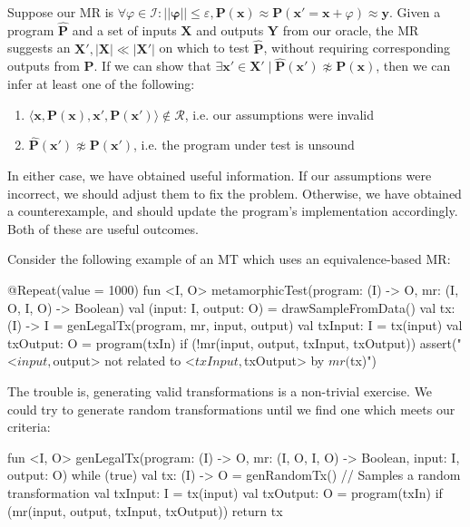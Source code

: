 \documentclass[12pt,initial,twoside,maitrise]{dms}
\numberwithin{equation}{section}
\numberwithin{table}{chapter}
\numberwithin{figure}{chapter}
\begin{document}
Suppose our MR is $\forall \varphi \in \mathcal I: ||\mathbf\varphi|| \leq \varepsilon, \mathbf P(\mathbf x) \approx \mathbf P(\mathbf x' = \mathbf x + \varphi) \approx \mathbf y$. Given a program $\mathbf{\hat P}$ and a set of inputs $\mathbf X$ and outputs $\mathbf Y$ from our oracle, the MR suggests an $\mathbf X', |\mathbf X| \ll |\mathbf X'|$ on which to test $\mathbf{\hat P}$, without requiring corresponding outputs from $\mathbf P$. If we can show that $\exists \mathbf x' \in \mathbf X' \mid \mathbf{\hat P}(\mathbf x') \not\approx \mathbf P(\mathbf x)$, then we can infer at least one of the following:

\begin{enumerate}
\item $\langle \mathbf x, \mathbf P(\mathbf x), \mathbf x', \mathbf P(\mathbf x')\rangle \notin \mathcal R$, i.e. our assumptions were invalid
\item $\mathbf{\hat P}(\mathbf x') \not\approx \mathbf{P}(\mathbf x')$, i.e. the program under test is unsound
\end{enumerate}
%
In either case, we have obtained useful information. If our assumptions were incorrect, we should adjust them to fix the problem. Otherwise, we have obtained a counterexample, and should update the program's implementation accordingly. Both of these are useful outcomes.

Consider the following example of an MT which uses an equivalence-based MR:

\begin{kotlinlisting}
@Repeat(value = 1000)
fun <I, O> metamorphicTest(program: (I) -> O, mr: (I, O, I, O) -> Boolean) {
    val (input: I, output: O) = drawSampleFromData()
    val tx: (I) -> I = genLegalTx(program, mr, input, output)
    val txInput: I = tx(input)
    val txOutput: O = program(txIn)
    if (!mr(input, output, txInput, txOutput))
        assert("<$input, $output> not related to <$txInput, $txOutput> by $mr ($tx)")
}
\end{kotlinlisting}
%
The trouble is, generating valid transformations is a non-trivial exercise. We could try to generate random transformations until we find one which meets our criteria:
%
\begin{kotlinlisting}
fun <I, O> genLegalTx(program: (I) -> O, mr: (I, O, I, O) -> Boolean, input: I, output: O) {
    while (true) {
        val tx: (I) -> O = genRandomTx() // Samples a random transformation
        val txInput: I = tx(input)
        val txOutput: O = program(txIn)
        if (mr(input, output, txInput, txOutput)) return tx
    }
}
\end{kotlinlisting}
\end{document}
